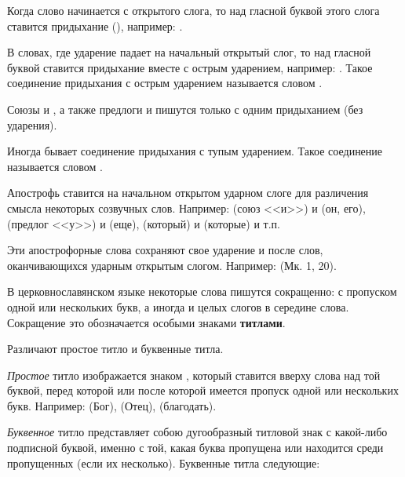 \documentclass[11pt,a4paper,oneside]{memoir}
\newcommand{\mockitem}[1]{{\mock{#1}}}
\begin{document}
    \bigskip
    \mockitem{2. Придыхание}
    \medskip
    
    Когда слово начинается с открытого слога, то над гласной буквой этого слога ставится придыхание ({}), например: {}.
    
    В словах, где ударение падает на начальный открытый слог, то над гласной буквой ставится придыхание вместе с острым ударением, например: {}. Такое соединение придыхания с острым ударением называется словом {}.
    
    Союзы {} и {}, а также предлоги {} и {} пишутся только с одним придыханием (без ударения).
    
    Иногда бывает соединение придыхания с тупым ударением. Такое соединение называется словом {}.
    
    Апострофь ставится на начальном открытом ударном слоге для различения смысла некоторых созвучных слов. Например: {} (союз <<и>>) и {} (он, его), {} (предлог <<у>>) и {} (еще), {} (который) и {} (которые) и т.п.

    Эти апострофорные слова сохраняют свое ударение и после слов, оканчивающихся ударным открытым слогом. Например: {} (Мк. 1, 20).
    
    \bigskip
    \mockitem{3. Титла}
    \medskip
    
    В церковнославянском языке некоторые слова пишутся сокращенно: с пропуском одной или нескольких букв, а иногда и целых слогов в середине слова. Сокращение это обозначается особыми знаками \textbf{титлами}.
    
    Различают простое титло и буквенные титла.
    
    \emph{Простое} титло изображается знаком {}, который ставится вверху слова над той буквой, перед которой или после которой имеется пропуск одной или нескольких букв. Например: {} (Бог), {} (Отец), {} (благодать).
    
    \emph{Буквенное} титло представляет собою дугообразный титловой знак {} с какой-либо подписной буквой, именно с той, какая буква пропущена или находится среди пропущенных (если их несколько). Буквенные титла следующие:

    \bigskip{}
\end{document}
